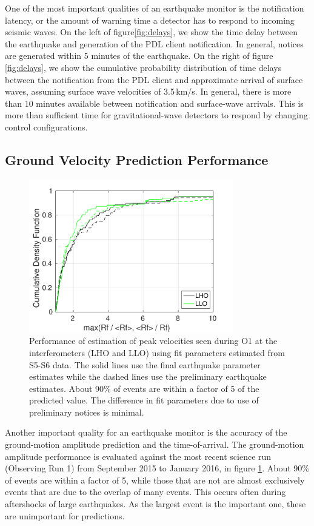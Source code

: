 \documentclass[twocolumn, prl, superscriptaddress]{revtex4}
\begin{document}
One of the most important qualities of an earthquake monitor is the notification latency, or the amount of warning time a detector has to respond to incoming seismic waves. On the left of figure\ref{fig:delays}, we show the time delay between the earthquake and generation of the PDL client notification. In general, notices are generated within 5 minutes of the earthquake. On the right of figure \ref{fig:delays}, we show the cumulative probability distribution of time delays between the notification from the PDL client and approximate arrival of surface waves, assuming surface wave velocities of 3.5\,km/s. In general, there is more than 10 minutes available between notification and surface-wave arrivals. This is more than sufficient time for gravitational-wave detectors to respond by changing control configurations.

\subsection{Ground Velocity Prediction Performance}

\begin{figure}[t]
\hspace*{-0.5cm}
 \includegraphics[width=3.5in]{initial_final_vs_real.pdf}
 \caption{Performance of estimation of peak velocities seen during O1 at the interferometers (LHO and LLO) using fit parameters estimated from S5-S6 data. The solid lines use the final earthquake parameter estimates while the dashed lines use the preliminary earthquake estimates. About 90\% of events are within a factor of 5 of the predicted value. The difference in fit parameters due to use of preliminary notices is minimal.}
 \label{fig:regressionperf}
\end{figure}

Another important quality for an earthquake monitor is the accuracy of the ground-motion amplitude prediction and the time-of-arrival.
The ground-motion amplitude performance is evaluated against the most recent science run (Observing Run 1) from September 2015 to January 2016, in figure \ref{fig:regressionperf}. About 90\% of events are within a factor of 5, while those that are not are almost exclusively events that are due to the overlap of many events. This occurs often during aftershocks of large earthquakes. As the largest event is the important one, these are unimportant for predictions. 
\end{document}
